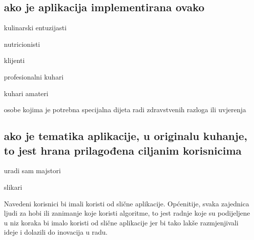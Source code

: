		\subsection {ako je aplikacija implementirana ovako}
		\begin{packed_item}
			\item kulinarski entuzijasti
			\item nutricionisti
			\item klijenti
			\item[]\begin{packed_item}
				\item profesionalni kuhari
				\item kuhari amateri
				\item osobe kojima je potrebna specijalna dijeta radi zdravstvenih razloga ili uvjerenja
			\end{packed_item}
		\end{packed_item}
		
		\subsection{ako je tematika aplikacije, u originalu kuhanje, to jest hrana prilagođena ciljanim korisnicima}
		\begin{packed_item}
			\item uradi sam majstori
			\item slikari
		\end{packed_item}
		Navedeni korisnici bi imali koristi od slične aplikacije. Općenitije, svaka zajednica ljudi za hobi ili zanimanje koje koristi algoritme, to jest radnje koje su podijeljene u niz koraka bi imalo koristi od slične aplikacije jer bi tako lakše razmjenjivali ideje i dolazili do inovacija u radu.

